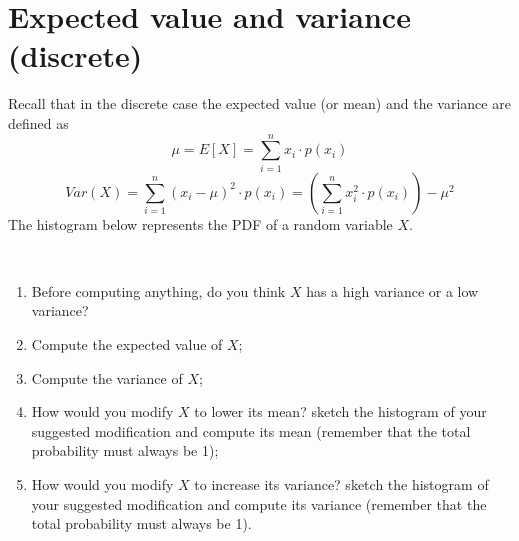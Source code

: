 \documentclass[10pt]{article}
\begin{document}
\section{Expected value and variance (discrete)}
Recall that in the discrete case the expected value (or mean) and the variance are defined as
\[
\mu=E[X]=\sum_{i=1}^nx_i \cdot p(x_i)
\]
\[
Var(X)= \sum_{i=1}^n (x_i-\mu)^2\cdot p(x_i)=  \left( \sum_{i=1}^n x_i^2\cdot p(x_i)  \right) -\mu^2
\]
The histogram below represents the PDF of a random variable $X$. 
\\ 
\\
\begin{enumerate}
    \item Before computing anything, do you think $X$ has a high variance or a low variance? 
    \item Compute the expected value of $X$;
    \item Compute the variance of $X$;
    \item How would you modify $X$ to lower its mean? sketch the histogram of your suggested modification and compute its mean (remember that the total probability must always be 1);
    \item How would you modify $X$ to increase its variance? sketch the histogram of your suggested modification and compute its variance  (remember that the total probability must always be 1).
\end{enumerate}



\newpage
\end{document}
